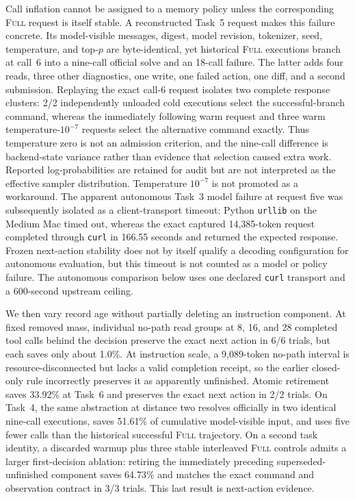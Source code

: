 \documentclass[11pt]{article}
\begin{document}
Call inflation cannot be assigned to a memory policy unless the corresponding
\textsc{Full} request is itself stable.  A reconstructed Task~5 request makes
this failure concrete.  Its model-visible messages, digest, model revision,
tokenizer, seed, temperature, and top-$p$ are byte-identical, yet historical
\textsc{Full} executions branch at call~6 into a nine-call official solve and
an 18-call failure.  The latter adds four reads, three other diagnostics, one
write, one failed action, one diff, and a second submission.  Replaying the
exact call-6 request isolates two complete response clusters: 2/2 independently
unloaded cold executions select the successful-branch command, whereas the
immediately following warm request and three warm temperature-$10^{-7}$
requests select the alternative command exactly.  Thus temperature zero is
not an admission criterion, and the nine-call difference is backend-state
variance rather than evidence that selection caused extra work.  Reported
log-probabilities are retained for audit but are not interpreted as the
effective sampler distribution. Temperature $10^{-7}$ is not promoted as a
workaround. The apparent autonomous Task~3 model failure at request five was
subsequently isolated as a client-transport timeout: Python \texttt{urllib} on
the Medium Mac timed out, whereas the exact captured 14,385-token request
completed through \texttt{curl} in 166.55 seconds and returned the expected
response. Frozen next-action stability does not by itself qualify a decoding
configuration for autonomous evaluation, but this timeout is not counted as a
model or policy failure. The autonomous comparison below uses one declared
\texttt{curl} transport and a 600-second upstream ceiling.

We then vary record age without partially deleting an instruction component.
At fixed removed mass, individual no-path read groups at 8, 16, and 28
completed tool calls behind the decision preserve the exact next action in
6/6 trials, but each saves only about 1.0\%.  At instruction scale, a
9,089-token no-path interval is resource-disconnected but lacks a valid
completion receipt, so the earlier closed-only rule incorrectly preserves it
as apparently unfinished.  Atomic retirement saves 33.92\% at Task~6 and
preserves the exact next action in 2/2 trials.  On Task~4, the same abstraction
at distance two resolves officially in two identical nine-call executions,
saves 51.61\% of cumulative model-visible input, and uses five fewer calls
than the historical successful \textsc{Full} trajectory.  On a second task
identity, a discarded warmup plus three stable interleaved \textsc{Full}
controls admits a larger first-decision ablation: retiring the immediately
preceding superseded-unfinished component saves 64.73\% and matches the exact
command and observation contract in 3/3 trials. This last result is
next-action evidence.
\end{document}
